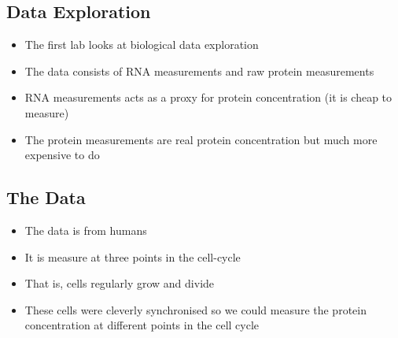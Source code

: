 \Outline

\begin{slide}
\section{Data Exploration}

\begin{PauseHighLight}
  \begin{itemize}
  \item The first lab looks at biological data exploration\pause
  \item The data consists of RNA measurements and raw protein
    measurements\pause
  \item RNA measurements acts as a proxy for protein concentration (it
    is cheap to measure)\pause
  \item The protein measurements are real protein concentration but
    much more expensive to do\pause
  \end{itemize}
\end{PauseHighLight}

\end{slide}


\begin{slide}
\section{The Data}

\begin{PauseHighLight}
  \begin{itemize}
  \item The data is from humans\pause
  \item It is measure at three points in the cell-cycle\pause
  \item That is, cells regularly grow and divide\pause
  \item These cells were cleverly synchronised so we could measure the
    protein concentration at different points in the cell cycle\pause
  \end{itemize}
\end{PauseHighLight}

\end{slide}


